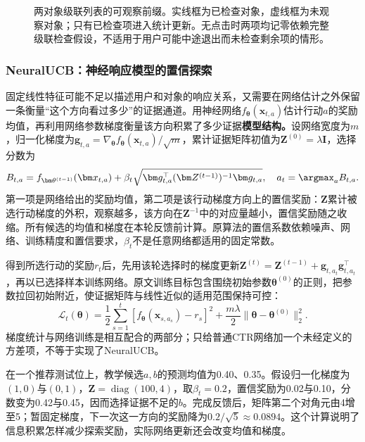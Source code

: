 \begin{figure}[htbp]
 \centering
 
 \caption{两对象级联列表的可观察前缀。实线框为已检查对象，虚线框为未观察对象；只有已检查项进入统计更新。无点击时两项均记零依赖完整级联检查假设，不适用于用户可能中途退出而未检查剩余项的情形。}
 \label{fig:rs-cascade-feedback}
\end{figure}

\subsubsection{NeuralUCB：神经响应模型的置信探索}
\label{sec:rs-neuralucb}

固定线性特征可能不足以描述用户和对象的响应关系，又需要在网络估计之外保留一条衡量“这个方向看过多少”的证据通道。用神经网络$f_{\bm\theta}(\bm x_{t,a})$估计行动$a$的奖励均值，再利用网络参数梯度衡量该方向积累了多少证据\textbf{模型结构。}设网络宽度为$m$，归一化梯度为$\bm g_{t,a}=\nabla_{\bm\theta}f_{\bm\theta}(\bm x_{t,a})/\sqrt m$，累计证据矩阵初值为$\bm Z^{(0)}=\lambda\bm I$，选择分数为
\begin{equation}
 B_{t,a}=f_{\bm\theta^{(t-1)}}(\bm x_{t,a})
          +\beta_t\sqrt{\bm g_{t,a}^\top
                      (\bm Z^{(t-1)})^{-1}\bm g_{t,a}},
 \quad a_t=\argmax_a B_{t,a}.
 \label{eq:rs-neuralucb}
\end{equation}
第一项是网络给出的奖励均值，第二项是该行动梯度方向上的置信奖励：$\bm Z$累计被选行动梯度的外积，观察越多，该方向在$\bm Z^{-1}$中的对应量越小，置信奖励随之收缩。所有候选的均值和梯度在本轮反馈前计算。原算法的置信系数依赖噪声、网络、训练精度和置信要求，$\beta_t$不是任意网络都适用的固定常数。

得到所选行动的奖励$r_t$后，先用该轮选择时的梯度更新$\bm Z^{(t)}=\bm Z^{(t-1)}+\bm g_{t,a_t}\bm g_{t,a_t}^\top$，再以已选择样本训练网络。原文训练目标包含围绕初始参数$\bm\theta^{(0)}$的正则，把参数拉回初始附近，使证据矩阵与线性近似的适用范围保持可控：
\begin{equation}
 \mathcal L_t(\bm\theta)=
 \frac12\sum_{s=1}^{t}
       [f_{\bm\theta}(\bm x_{s,a_s})-r_s]^2
 +\frac{m\lambda}{2}
       \lVert\bm\theta-\bm\theta^{(0)}\rVert_2^2.
 \label{eq:rs-neuralucb-train}
\end{equation}
梯度统计与网络训练是相互配合的两部分；只给普通CTR网络加一个未经定义的方差项，不等于实现了NeuralUCB。

在一个推荐测试位上，教学候选$a,b$的预测均值为0.40、0.35。假设归一化梯度为$(1,0)$与$(0,1)$，$\bm Z=\operatorname{diag}(100,4)$，取$\beta_t=0.2$，置信奖励为0.02与0.10，分数变为0.42与0.45，因而选择证据不足的$b$。完成反馈后，矩阵第二个对角元由4增至5；暂固定梯度，下一次这一方向的奖励降为$0.2/\sqrt5\approx0.0894$。这个计算说明了信息积累怎样减少探索奖励，实际网络更新还会改变均值和梯度。

